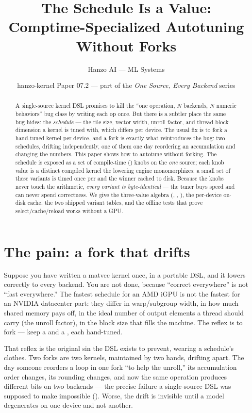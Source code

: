 \documentclass[11pt]{article}
\title{\textbf{The Schedule Is a Value:\\ Comptime-Specialized Autotuning Without Forks}}
\author{Hanzo AI --- ML Systems}
\date{hanzo-kernel Paper 07.2 --- part of the \emph{One Source, Every Backend} series}
\begin{document}
\maketitle

\begin{abstract}
A single-source kernel DSL promises to kill the ``one operation, $N$ backends, $N$ numeric behaviors''
bug class by writing each op once. But there is a subtler place the same bug hides: the \emph{schedule}
--- the tile size, vector width, unroll factor, and thread-block dimension a kernel is tuned with, which
differs per device. The usual fix is to fork a hand-tuned kernel per device, and a fork is exactly what
reintroduces the bug: two schedules, drifting independently, one of them one day reordering an
accumulation and changing the numbers. This paper shows how to autotune without forking. The schedule is
exposed as a set of compile-time (\code{\#[comptime]}) knobs on the \emph{one} source; each knob value is
a distinct compiled kernel the lowering engine monomorphizes; a small set of these variants is timed once
per  and the winner cached to disk. Because the knobs never touch the
arithmetic, \emph{every variant is byte-identical} --- the tuner buys speed and can never spend
correctness. We give the three-value algebra (, , ), the
per-device on-disk cache, the two shipped variant tables, and the offline tests that prove
select/cache/reload works without a GPU.
\end{abstract}

\section{The pain: a fork that drifts}
\label{sec:pain}

Suppose you have written a matvec kernel once, in a portable DSL, and it lowers correctly to every
backend. You are not done, because ``correct everywhere'' is not ``fast everywhere.'' The fastest
schedule for an AMD iGPU is not the fastest for an NVIDIA datacenter part: they differ in warp/subgroup
width, in how much shared memory pays off, in the ideal number of output elements a thread should carry
(the unroll factor), in the block size that fills the machine. The reflex is to fork --- keep a
 and a , each hand-tuned.

That reflex is the original sin the DSL exists to prevent, wearing a schedule's clothes. Two forks are
two kernels, maintained by two hands, drifting apart. The day someone reorders a loop in one fork ``to
help the unroll,'' its accumulation order changes, its rounding changes, and now the same operation
produces different bits on two backends --- the precise failure a single-source DSL was supposed to make
impossible (\cite{oracle}). Worse, the drift is invisible until a model degenerates on one device and not
another.
\end{document}
